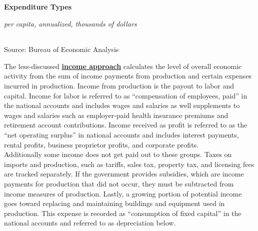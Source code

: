 \documentclass{report}
\begin{document}
\begin{minipage}{0.76\textwidth}
\normalsize \textbf{Expenditure Types}

\footnotesize{\textit{per capita, annualized, thousands of dollars}}

\hspace{-2mm}  \setlength{\tabcolsep}{3.7pt} \color{black!90}
		{\renewcommand{\arraystretch}{1.6}
		 \begin{tabular}{p{54mm} R{13mm} R{13mm} R{13mm} R{13mm}}
			 \hline
		\end{tabular}}
\vspace{1mm}

\footnotesize{Source: Bureau of Economic Analysis}

\end{minipage}
\newpage
\begin{minipage}{0.76\textwidth}
\small The less-discussed \textbf{\href{https://www.bea.gov/help/glossary/income-approach}{income approach}} calculates the level of overall economic activity from the sum of income payments from production and certain expenses incurred in production. Income from production is the payout to labor and capital. Income for labor is referred to as ``compensation of employees, paid'' in the national accounts and includes wages and salaries as well supplements to wages and salaries such as employer-paid health insurance premiums and retirement account contributions. Income received as profit is referred to as the ``net operating surplus'' in national accounts and includes interest payments, rental profits, business proprietor profits, and corporate profits.\\

Additionally some income does not get paid out to these groups. Taxes on imports and production, such as tariffs, sales tax, property tax, and licensing fees are tracked separately. If the government provides subsidies, which are income payments for production that did not occur, they must be subtracted from income measures of production. Lastly, a growing portion of potential income goes toward replacing and maintaining buildings and equipment used in production. This expense is recorded as ``consumption of fixed capital'' in the national accounts and referred to as depreciation below.\\


\end{minipage}
\end{document}

